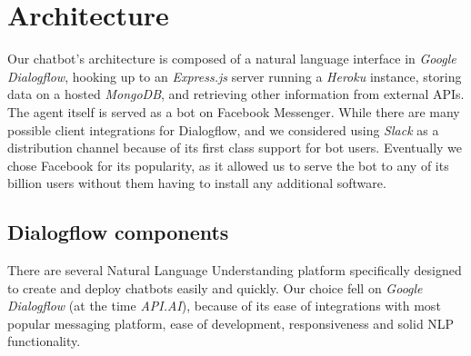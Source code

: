 \section{Architecture}
Our chatbot's architecture is composed of a natural language interface in \textit{Google Dialogflow}, hooking up to an \textit{Express.js} server running a \textit{Heroku} instance, storing data on a hosted \textit{MongoDB}, and retrieving other information from external APIs. \\
The agent itself is served as a bot on Facebook Messenger. While there are many possible client integrations for Dialogflow, and we considered using \textit{Slack} as a distribution channel because of its first class support for bot users. Eventually we chose Facebook for its popularity, as it allowed us to serve the bot to any of its billion users without them having to install any additional software.
\subsection{Dialogflow components}
There are several Natural Language Understanding platform specifically designed to create and deploy chatbots easily and quickly. Our choice fell on \textit{Google Dialogflow} (at the time \textit{API.AI}), because of its ease of integrations with most popular messaging platform, ease of development, responsiveness and solid NLP functionality. 

